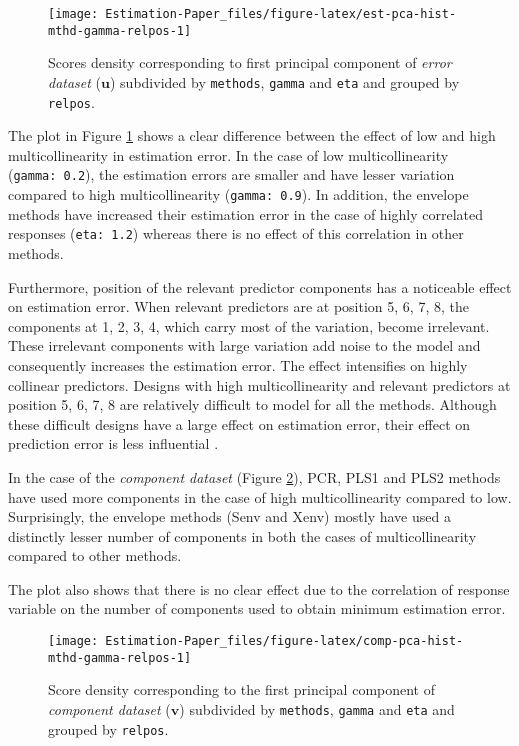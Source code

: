 \documentclass[12pt,3p,authoryear]{elsarticle}
\begin{document}
\begin{figure}[!htb]
\texttt{[image: Estimation-Paper\_files/figure-latex/est-pca-hist-mthd-gamma-relpos-1]} \caption{Scores density corresponding to first principal component of \emph{error dataset} (\(\mathbf{u}\)) subdivided by \texttt{methods}, \texttt{gamma} and \texttt{eta} and grouped by \texttt{relpos}.}\label{fig:est-pca-hist-mthd-gamma-relpos}
\end{figure}

The plot in Figure \ref{fig:est-pca-hist-mthd-gamma-relpos} shows a clear difference between the effect of low and high multicollinearity in estimation error. In the case of low multicollinearity (\texttt{gamma:\ 0.2}), the estimation errors are smaller and have lesser variation compared to high multicollinearity (\texttt{gamma:\ 0.9}). In addition, the envelope methods have increased their estimation error in the case of highly correlated responses (\texttt{eta:\ 1.2}) whereas there is no effect of this correlation in other methods.

Furthermore, position of the relevant predictor components has a noticeable effect on estimation error. When relevant predictors are at position 5, 6, 7, 8, the components at 1, 2, 3, 4, which carry most of the variation, become irrelevant. These irrelevant components with large variation add noise to the model and consequently increases the estimation error. The effect intensifies on highly collinear predictors. Designs with high multicollinearity and relevant predictors at position 5, 6, 7, 8 are relatively difficult to model for all the methods. Although these difficult designs have a large effect on estimation error, their effect on prediction error is less influential \citep{rimal2019pred}.



In the case of the \emph{component dataset} (Figure \ref{fig:comp-pca-hist-mthd-gamma-relpos}), PCR, PLS1 and PLS2 methods have used more components in the case of high multicollinearity compared to low. Surprisingly, the envelope methods (Senv and Xenv) mostly have used a distinctly lesser number of components in both the cases of multicollinearity compared to other methods.

The plot also shows that there is no clear effect due to the correlation of response variable on the number of components used to obtain minimum estimation error.

\begin{figure}[!htb]
\texttt{[image: Estimation-Paper\_files/figure-latex/comp-pca-hist-mthd-gamma-relpos-1]} \caption{Score density corresponding to the first principal component of \emph{component dataset} (\(\mathbf{v}\)) subdivided by \texttt{methods}, \texttt{gamma} and \texttt{eta} and grouped by \texttt{relpos}.}\label{fig:comp-pca-hist-mthd-gamma-relpos}
\end{figure}
\end{document}
